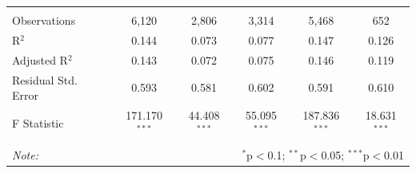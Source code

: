 \documentclass[12pt,a4paper]{article}
\begin{document}
\begin{table}[!htbp]
\begin{tabular}{@{\extracolsep{5pt}}lccccc}
  & & & & & \\ 
\hline \\[-1.8ex] 
Observations & 6,120 & 2,806 & 3,314 & 5,468 & 652 \\ 
R$^{2}$ & 0.144 & 0.073 & 0.077 & 0.147 & 0.126 \\ 
Adjusted R$^{2}$ & 0.143 & 0.072 & 0.075 & 0.146 & 0.119 \\ 
Residual Std. Error & 0.593 & 0.581 & 0.602 & 0.591 & 0.610 \\ 
F Statistic & 171.170$^{***}$ & 44.408$^{***}$ & 55.095$^{***}$ & 187.836$^{***}$ & 18.631$^{***}$ \\ 
\hline 
\hline \\[-1.8ex] 
\textit{Note:}  & \multicolumn{5}{r}{$^{*}$p$<$0.1; $^{**}$p$<$0.05; $^{***}$p$<$0.01} \\ 
\end{tabular} 
\end{table} 

\newpage
\end{document}
